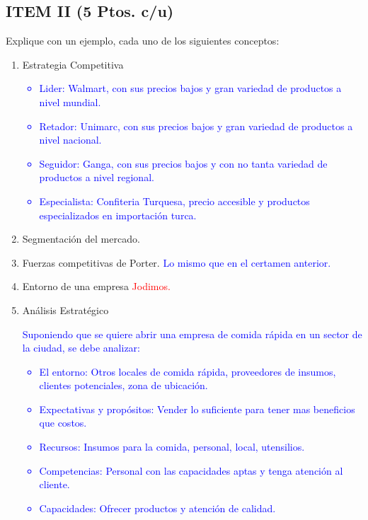 \documentclass{templateNote}
\begin{document}
\subsection*{ITEM II (5 Ptos. c/u)}
Explique con un ejemplo, cada uno de los siguientes conceptos:
\begin{enumerate}
    \item Estrategia Competitiva
    \textcolor{blue}{
        \begin{itemize}
            \item Lider: Walmart, con sus precios bajos y gran variedad de productos a nivel mundial.
            \item Retador: Unimarc, con sus precios bajos y gran variedad de productos a nivel nacional.
            \item Seguidor: Ganga, con sus precios bajos y con no tanta variedad de productos a nivel regional.
            \item Especialista: Confiteria Turquesa, precio accesible y productos especializados en importación turca.
        \end{itemize}
    }
    \item Segmentación del mercado.
    \item Fuerzas competitivas de Porter.\newline
    \textcolor{blue}{
        Lo mismo que en el certamen anterior.
    }
    \item Entorno de una empresa
    \textcolor{red}{
        Jodimos.
    }
    \item Análisis Estratégico\newline
    \textcolor{blue}{
        Suponiendo que se quiere abrir una empresa de comida rápida en un sector de la ciudad, se debe analizar:
        \begin{itemize}
            \item El entorno: Otros locales de comida rápida, proveedores de insumos, clientes potenciales, zona de ubicación.
            \item Expectativas y propósitos: Vender lo suficiente para tener mas beneficios que costos.
            \item Recursos: Insumos para la comida, personal, local, utensilios.
            \item Competencias: Personal con las capacidades aptas y tenga atención al cliente.
            \item Capacidades: Ofrecer productos y atención de calidad.
        \end{itemize}
    }
\end{enumerate}
\end{document}
